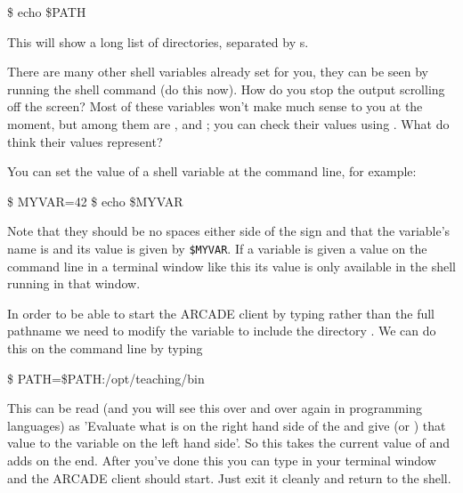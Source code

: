 \begin{ttoutenv}
\$ echo \$PATH
\end{ttoutenv}

This will show a long list of directories, separated by \ttout{:}s.

There are many other shell variables already set for you, they can be
seen by running the shell command  (do this now). How do you stop the
output scrolling off the screen? Most of these variables won't make
much sense to you at the moment, but among them are ,
 and ; you can check their values using
. What do think their values represent?

You can set the value of a shell variable at the command line, for example:

\begin{ttoutenv}
\$ MYVAR=42
\$ echo \$MYVAR
\end{ttoutenv}


Note that they should be no spaces either side of the \ttout{=} sign and that the variable's name is  and its value is given by \verb+$MYVAR+. If a variable is given a value on the command line in a terminal window like this its value is only available in the shell running in that window.

In order to be able to start the ARCADE client by typing  rather than the full pathname  we need to modify the  variable to include the directory . We can do this on the command line by typing

\begin{ttoutenv}
\$ PATH=\$PATH:/opt/teaching/bin
\end{ttoutenv}

This can be read (and you will see this over and over again in
programming languages) as 'Evaluate what is on the right hand side of
the \ttout{=} and give (or ) that value to the variable on the left hand side'. So this takes the current value of  and adds
 on the end. After you've done this you can
type  in your terminal window and the ARCADE client
should start. Just exit it cleanly and return to the shell.


